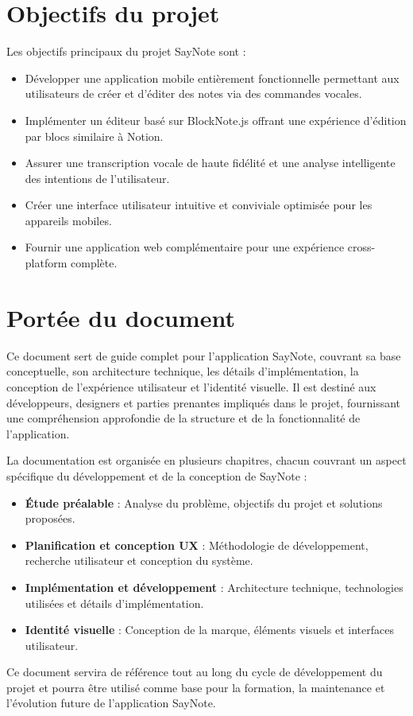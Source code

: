 \section*{Objectifs du projet}

Les objectifs principaux du projet SayNote sont :

\begin{itemize}
    \item Développer une application mobile entièrement fonctionnelle permettant aux utilisateurs de créer et d'éditer des notes via des commandes vocales.
    \item Implémenter un éditeur basé sur BlockNote.js offrant une expérience d'édition par blocs similaire à Notion.
    \item Assurer une transcription vocale de haute fidélité et une analyse intelligente des intentions de l'utilisateur.
    \item Créer une interface utilisateur intuitive et conviviale optimisée pour les appareils mobiles.
    \item Fournir une application web complémentaire pour une expérience cross-platform complète.
\end{itemize}

\vspace{1cm}

\section*{Portée du document}

Ce document sert de guide complet pour l'application SayNote, couvrant sa base conceptuelle, son architecture technique, les détails d'implémentation, la conception de l'expérience utilisateur et l'identité visuelle. Il est destiné aux développeurs, designers et parties prenantes impliqués dans le projet, fournissant une compréhension approfondie de la structure et de la fonctionnalité de l'application.

La documentation est organisée en plusieurs chapitres, chacun couvrant un aspect spécifique du développement et de la conception de SayNote :

\begin{itemize}
    \item \textbf{Étude préalable} : Analyse du problème, objectifs du projet et solutions proposées.
    \item \textbf{Planification et conception UX} : Méthodologie de développement, recherche utilisateur et conception du système.
    \item \textbf{Implémentation et développement} : Architecture technique, technologies utilisées et détails d'implémentation.
    \item \textbf{Identité visuelle} : Conception de la marque, éléments visuels et interfaces utilisateur.
\end{itemize}

Ce document servira de référence tout au long du cycle de développement du projet et pourra être utilisé comme base pour la formation, la maintenance et l'évolution future de l'application SayNote. 
